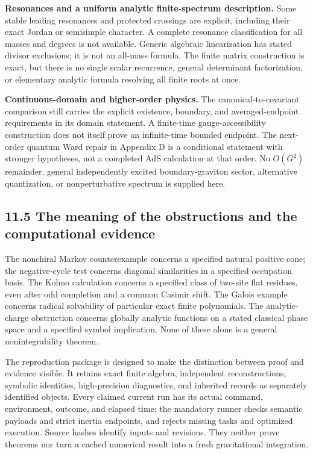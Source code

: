 \documentclass[a4paper,11pt]{article}
\numberwithin{equation}{section}
\begin{document}
\textbf{Resonances and a uniform analytic finite-spectrum description.} Some stable leading resonances and protected crossings are explicit, including their exact Jordan or semisimple character. A complete resonance classification for all masses and degrees is not available. Generic algebraic linearization has stated divisor exclusions; it is not an all-mass formula. The finite matrix construction is exact, but there is no single scalar recurrence, general determinant factorization, or elementary analytic formula resolving all finite roots at once.

\textbf{Continuous-domain and higher-order physics.} The canonical-to-covariant comparison still carries the explicit existence, boundary, and averaged-endpoint requirements in its domain statement. A finite-time gauge-accessibility construction does not itself prove an infinite-time bounded endpoint. The next-order quantum Ward repair in Appendix D is a conditional statement with stronger hypotheses, not a completed AdS calculation at that order. No \(O(G^2)\) remainder, general independently excited boundary-graviton sector, alternative quantization, or nonperturbative spectrum is supplied here.

\hypertarget{the-meaning-of-the-obstructions-and-the-computational-evidence}{%
\subsection{11.5 The meaning of the obstructions and the computational evidence}\label{the-meaning-of-the-obstructions-and-the-computational-evidence}}

The nonchiral Markov counterexample concerns a specified natural positive cone; the negative-cycle test concerns diagonal similarities in a specified occupation basis. The Kohno calculation concerns a specified class of two-site flat residues, even after odd completion and a common Casimir shift. The Galois example concerns radical solvability of particular exact finite polynomials. The analytic-charge obstruction concerns globally analytic functions on a stated classical phase space and a specified symbol implication. None of these alone is a general nonintegrability theorem.

The reproduction package is designed to make the distinction between proof and evidence visible. It retains exact finite algebra, independent reconstructions, symbolic identities, high-precision diagnostics, and inherited records as separately identified objects. Every claimed current run has its actual command, environment, outcome, and elapsed time; the mandatory runner checks semantic payloads and strict inertia endpoints, and rejects missing tasks and optimized execution. Source hashes identify inputs and revisions. They neither prove theorems nor turn a cached numerical result into a fresh gravitational integration.
\end{document}
